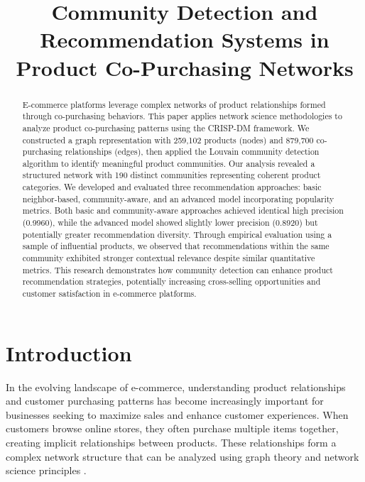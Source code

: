 \documentclass[conference]{IEEEtran}
\begin{document}
\title{Community Detection and Recommendation Systems in Product Co-Purchasing Networks}

\author{
}

\maketitle

\begin{abstract}
E-commerce platforms leverage complex networks of product relationships formed through co-purchasing behaviors. This paper applies network science methodologies to analyze product co-purchasing patterns using the CRISP-DM framework. We constructed a graph representation with 259,102 products (nodes) and 879,700 co-purchasing relationships (edges), then applied the Louvain community detection algorithm to identify meaningful product communities. Our analysis revealed a structured network with 190 distinct communities representing coherent product categories. We developed and evaluated three recommendation approaches: basic neighbor-based, community-aware, and an advanced model incorporating popularity metrics. Both basic and community-aware approaches achieved identical high precision (0.9960), while the advanced model showed slightly lower precision (0.8920) but potentially greater recommendation diversity. Through empirical evaluation using a sample of influential products, we observed that recommendations within the same community exhibited stronger contextual relevance despite similar quantitative metrics. This research demonstrates how community detection can enhance product recommendation strategies, potentially increasing cross-selling opportunities and customer satisfaction in e-commerce platforms.
\end{abstract}

\section{Introduction}
In the evolving landscape of e-commerce, understanding product relationships and customer purchasing patterns has become increasingly important for businesses seeking to maximize sales and enhance customer experiences. When customers browse online stores, they often purchase multiple items together, creating implicit relationships between products. These relationships form a complex network structure that can be analyzed using graph theory and network science principles \cite{linden2003amazon}.
\end{document}
